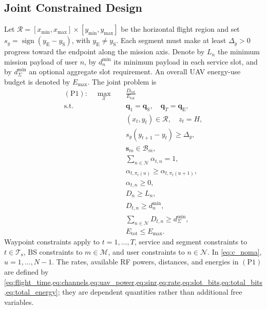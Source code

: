 \documentclass[conference]{IEEEtran}
\newcommand{\tot}{\mathrm{tot}}
\newcommand{\setT}{\mathcal{T}_{\mathrm{s}}}
\newcommand{\setN}{\mathcal{N}}
\newcommand{\setM}{\mathcal{M}}
\begin{document}
\subsection{Joint Constrained Design}
Let $\mathcal R=[x_{\min},x_{\max}]\times[y_{\min},y_{\max}]$ be the horizontal flight region and set $s_y=\operatorname{sign}(y_{\mathrm E}-y_{\mathrm S})$, with $y_{\mathrm E}\ne y_{\mathrm S}$. Each segment must make at least $\Delta_y>0$ progress toward the endpoint along the mission axis. Denote by $L_n$ the minimum mission payload of user $n$, by $d_n^{\min}$ its minimum payload in each service slot, and by $d_{\Sigma}^{\min}$ an optional aggregate slot requirement. An overall UAV energy-use budget is denoted by $E_{\max}$. The joint problem is
\begin{subequations}
\label{eq:P1}
\begin{align}
(\mathrm{P1}):\quad
\max_{\mathcal X}\quad&\frac{D_{\tot}}{E_{\tot}}
\label{eq:P1_obj}\\
\mathrm{s.t.}\quad
&\bm q_1=\bm q_{\mathrm S},\quad\bm q_T=\bm q_{\mathrm E},
\label{eq:c_endpoints}\\
&(x_t,y_t)\in\mathcal R,\quad z_t=H,\label{eq:c_region}\\
&s_y(y_{t+1}-y_t)\ge\Delta_y,\label{eq:c_progress}\\
&\bm s_m\in\mathcal B_m,\label{eq:c_bs}\\
&\sum_{n\in\setN}\alpha_{t,n}=1,\label{eq:c_alpha}\\
&\alpha_{t,\pi_t(u)}\ge\alpha_{t,\pi_t(u+1)},\label{eq:c_noma}\\
&\alpha_{t,n}\ge0,\label{eq:c_alpha_positive}\\
&D_n\ge L_n,\label{eq:c_payload}\\
&D_{t,n}\ge d_n^{\min},\label{eq:c_user_slot}\\
&\sum_{n\in\setN}D_{t,n}\ge d_{\Sigma}^{\min},\label{eq:c_slot}\\
&E_{\tot}\le E_{\max}.
\label{eq:c_budget}
\end{align}
\end{subequations}
Waypoint constraints apply to $t=1,\ldots,T$, service and segment constraints to $t\in\setT$, BS constraints to $m\in\setM$, and user constraints to $n\in\setN$. In \cref{eq:c_noma}, $u=1,\ldots,N-1$.
The rates, available RF powers, distances, and energies in $(\mathrm{P1})$ are defined by \cref{eq:flight_time,eq:channels,eq:uav_power,eq:sinr,eq:rate,eq:slot_bits,eq:total_bits,eq:total_energy}; they are dependent quantities rather than additional free variables.
\end{document}
